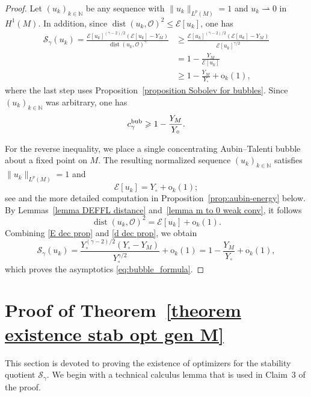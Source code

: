 \documentclass[reqno,11pt]{amsart}
\numberwithin{equation}{section}
\theoremstyle{definition}
\theoremstyle{remark}
\DeclareMathOperator{\dist}{dist}
\begin{document}
\begin{proof}
Let $(u_k)_{k \in \mathbb{N}}$ be any sequence with $\|u_k\|_{L^p(M)} = 1$ and $u_k \rightharpoonup 0$ in $H^1(M)$. In addition, since $\dist(u_k, \mathscr{O})^2 \leqslant \mathcal E[u_k]$, one has
\begin{align*}
\mathcal{S}_\gamma(u_k) = \frac{\mathcal E[u_k]^{(\gamma-2)/2} \left( \mathcal{E}[u_k] - Y_M \right)}{\dist(u_k,\mathscr{O})^\gamma}
&\geqslant \frac{\mathcal E[u_k]^{(\gamma-2)/2} \left( \mathcal{E}[u_k] - Y_M \right)}{\mathcal E[u_k]^{\gamma/2}} \\
&= 1 - \frac{Y_M}{\mathcal E[u_k]}\\
&\geqslant 1 - \frac{Y_M}{Y_\circ} + \mathrm{o}_k(1),
\end{align*}
where the last step uses Proposition~\ref{proposition Sobolev for bubbles}. Since $(u_k)_{k \in \mathbb{N}}$ was arbitrary, one has 
\[
c_\gamma^{\rm bub} \geqslant 1 - \frac{Y_M}{Y_\circ}.
\]

For the reverse inequality, we place a single concentrating Aubin--Talenti bubble about 
a fixed point on $M$. The resulting normalized sequence $(u_k)_{k \in \mathbb{N}}$ satisfies $\|u_k\|_{L^p(M)} = 1$ and
\begin{equation}
\label{E dec prop}
\mathcal E[u_k] = Y_\circ + \mathrm{o}_k(1);
\end{equation}
see \cite[Lemma~3.4]{LP} and the more detailed computation in Proposition~\ref{prop:aubin-energy} below. By Lemmas~\ref{lemma DEFFL distance} and~\ref{lemma m to 0 weak conv}, it follows
\begin{equation}
\label{d dec prop}
\dist(u_k, \mathscr{O})^2 = \mathcal E[u_k] + \mathrm{o}_k(1).
\end{equation}
Combining \eqref{E dec prop} and \eqref{d dec prop}, we obtain
\[
\mathcal{S}_\gamma(u_k) = \frac{Y_\circ^{(\gamma-2)/2}(Y_\circ - Y_M)}{Y_\circ^{\gamma/2}} + \mathrm{o}_k(1) = 1 - \frac{Y_M}{Y_\circ} + \mathrm{o}_k(1),
\]
which proves the asymptotics \eqref{eq:bubble_formula}.
\end{proof}


\section{Proof of Theorem~\ref{theorem existence stab opt gen M}}\label{sec:proof-thm1}
This section is devoted to proving the existence of optimizers for the stability quotient $\mathcal S_\gamma$. We begin with a technical calculus lemma that is used in Claim~3 of the proof.
\end{document}
